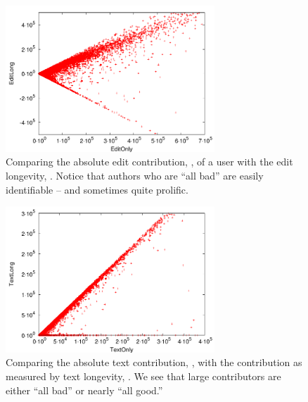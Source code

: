 \begin{figure}[tbhp]
    \begin{center}
    \includegraphics[width=0.70\textwidth]{part-I10-contrib/graphs/score-zoom-editonly-editlong}
    \end{center}
    \caption[Comparing absolute edit size with edit longevity]{
    	Comparing the absolute edit contribution, \editonly, of a user
	with the edit longevity, \editlong.
	Notice that authors who are ``all bad''
	are easily identifiable -- and sometimes quite prolific.
    }
    \label{fig-zoom-editonly-editlong}
\end{figure}
%
\begin{figure}[tbhp]
    \begin{center}
    \includegraphics[width=0.70\textwidth]{part-I10-contrib/graphs/score-zoom-textonly-textlong}
    \end{center}
    \caption[Comparing absolute text contribution with text longevity]{
    	Comparing the absolute text contribution, \textonly, with the contribution
	as measured by text longevity, \textlong.
	We see that large contributors are either ``all bad''
	or nearly ``all good.''
    }
    \label{fig-zoom-textonly-textlong}
\end{figure}
%
